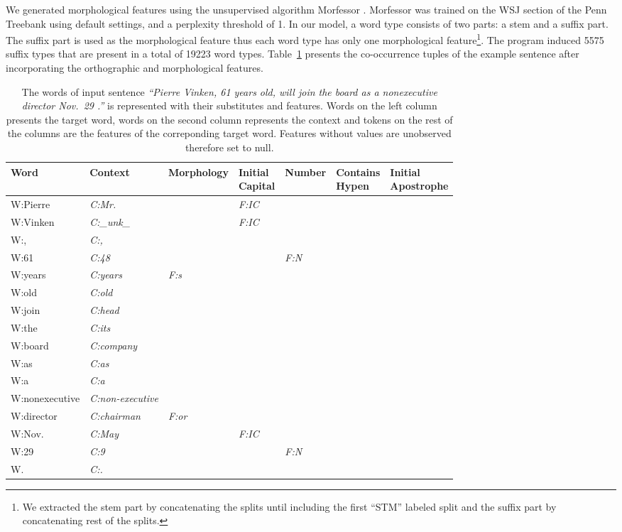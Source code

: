We generated morphological features using the unsupervised algorithm
Morfessor \cite{creutz05}.  Morfessor was trained on the WSJ section
of the Penn Treebank using default settings, and a perplexity
threshold of 1.  In our model, a word type consists of two parts: a
stem and a suffix part.  The suffix part is used as the morphological
feature thus each word type has only one morphological
feature\footnote{We extracted the stem part by concatenating the
  splits until including the first ``STM'' labeled split and the
  suffix part by concatenating rest of the splits.}.  The program
induced 5575 suffix types that are present in a total of 19223 word
types.  Table~\ref{tab:sampleswithfeatures} presents the co-occurrence
tuples of the example sentence after incorporating the orthographic
and morphological features.
\begin{table}[ht]
\centering
\small
\caption{The words of input sentence \textit{``Pierre Vinken, 61 years old, 
    will join the board as a nonexecutive director Nov.~29 .''} is represented 
  with their substitutes and features.  Words on the left 
  column presents the
  target word, words on the second column represents the context and
  tokens on the rest of the columns are the features of the
  correponding target word.  Features without values are unobserved
  therefore set to null.}
\begin{tabular}{|lllllll|}
\hline
\textbf{Word} & {\bf Context} & {\bf Morphology} &
\specialcell{{\bf Initial}\\{\bf Capital}} & {\bf Number} &
\specialcell{{\bf Contains}\\{\bf Hypen}} &
\specialcell{{\bf Initial}\\{\bf Apostrophe}}
\\
\hline
W:Pierre & \textit{C:Mr.} & & {\it F:IC} &&&\\
W:Vinken & \textit{C:\_unk\_} & & {\it F:IC} &&&\\
W:, & \textit{C:,} & & &&&\\
W:61 & \textit{C:48} & & & {\it F:N}&&\\
W:years & \textit{C:years} & {\it F:s} &&&&\\
W:old & \textit{C:old} & & &&&\\
W:join & \textit{C:head} &&&&&\\
W:the & \textit{C:its} &&&&&\\
W:board & \textit{C:company} &&&&&\\
W:as & \textit{C:as} &&&&&\\
W:a & \textit{C:a} &&&&&\\
W:nonexecutive & \textit{C:non-executive} &&&&&\\
W:director & \textit{C:chairman} & {\it F:or}&&&&\\
W:Nov. & \textit{C:May} &&{\it F:IC}&&&\\
W:29 & \textit{C:9} &&&{\it F:N}&&\\
W. & \textit{C:.} & &&&&\\
\hline
\end{tabular}
\label{tab:sampleswithfeatures}
\end{table}

